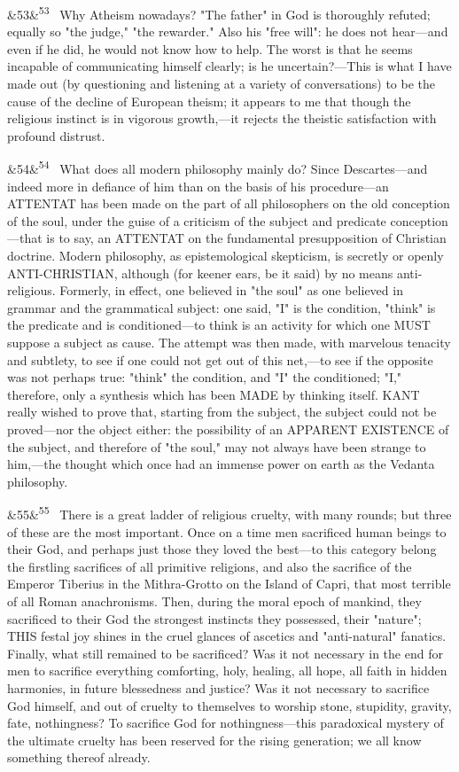 \documentclass[12pt]{article}
\newcommand{\para}[1][]{\par\noindent\ifx&#1&\else\textsuperscript{\footnotesize #1}~\fi}
\begin{document}
\para[53] Why Atheism nowadays? "The father" in God is thoroughly refuted; equally so "the judge," "the rewarder." Also his "free will": he does not hear---and even if he did, he would not know how to help. The worst is that he seems incapable of communicating himself clearly; is he uncertain?---This is what I have made out (by questioning and listening at a variety of conversations) to be the cause of the decline of European theism; it appears to me that though the religious instinct is in vigorous growth,---it rejects the theistic satisfaction with profound distrust.

\para[54] What does all modern philosophy mainly do? Since Descartes---and indeed more in defiance of him than on the basis of his procedure---an ATTENTAT has been made on the part of all philosophers on the old conception of the soul, under the guise of a criticism of the subject and predicate conception---that is to say, an ATTENTAT on the fundamental presupposition of Christian doctrine. Modern philosophy, as epistemological skepticism, is secretly or openly ANTI-CHRISTIAN, although (for keener ears, be it said) by no means anti-religious. Formerly, in effect, one believed in "the soul" as one believed in grammar and the grammatical subject: one said, "I" is the condition, "think" is the predicate and is conditioned---to think is an activity for which one MUST suppose a subject as cause. The attempt was then made, with marvelous tenacity and subtlety, to see if one could not get out of this net,---to see if the opposite was not perhaps true: "think" the condition, and "I" the conditioned; "I," therefore, only a synthesis which has been MADE by thinking itself. KANT really wished to prove that, starting from the subject, the subject could not be proved---nor the object either: the possibility of an APPARENT EXISTENCE of the subject, and therefore of "the soul," may not always have been strange to him,---the thought which once had an immense power on earth as the Vedanta philosophy.

\para[55] There is a great ladder of religious cruelty, with many rounds; but three of these are the most important. Once on a time men sacrificed human beings to their God, and perhaps just those they loved the best---to this category belong the firstling sacrifices of all primitive religions, and also the sacrifice of the Emperor Tiberius in the Mithra-Grotto on the Island of Capri, that most terrible of all Roman anachronisms. Then, during the moral epoch of mankind, they sacrificed to their God the strongest instincts they possessed, their "nature"; THIS festal joy shines in the cruel glances of ascetics and "anti-natural" fanatics. Finally, what still remained to be sacrificed? Was it not necessary in the end for men to sacrifice everything comforting, holy, healing, all hope, all faith in hidden harmonies, in future blessedness and justice? Was it not necessary to sacrifice God himself, and out of cruelty to themselves to worship stone, stupidity, gravity, fate, nothingness? To sacrifice God for nothingness---this paradoxical mystery of the ultimate cruelty has been reserved for the rising generation; we all know something thereof already.
\end{document}
